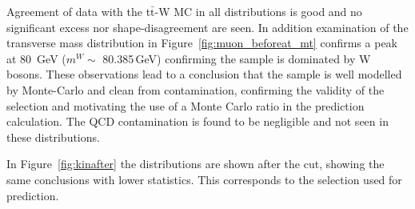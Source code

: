 Agreement of data with the t$\bar{\textrm{t}}$-W MC in all distributions is good and no significant excess nor shape-disagreement are seen. In addition examination of the transverse mass distribution in Figure~\ref{fig:muon_beforeat_mt} confirms a peak at 80~GeV ($m^{W} \sim$ 80.385\,GeV) confirming the sample is dominated by W bosons. These observations lead to a conclusion that the sample is well modelled by Monte-Carlo and clean from contamination, confirming the validity of the selection and motivating the use of a Monte Carlo ratio in the prediction calculation. The QCD contamination is found to be negligible and not seen in these distributions.

In Figure~\ref{fig:kinafter} the distributions are shown after the \alt cut, showing the same conclusions with lower statistics. This corresponds to the selection used for prediction.





